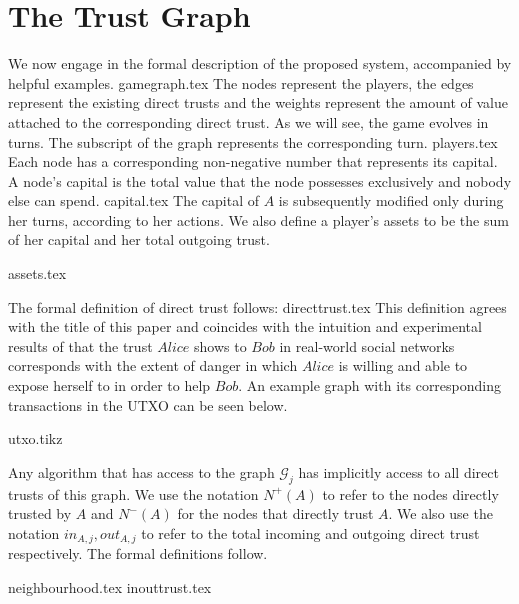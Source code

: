 \section{The Trust Graph}
   We now engage in the formal description of the proposed system, accompanied by helpful examples.
   {gamegraph.tex}
   The nodes represent the players, the edges represent the existing direct trusts and the weights represent the amount of
   value attached to the corresponding direct trust. As we will see, the game evolves in turns. The subscript of the graph
   represents the corresponding turn.
   {players.tex}
   Each node has a corresponding non-negative number that represents its capital. A node's capital is the total value that
   the node possesses exclusively and nobody else can spend.
   {capital.tex}
   The capital of $A$ is subsequently modified only during her turns, according to her actions. We also define a player's
   assets to be the sum of her capital and her total outgoing trust.

   {assets.tex}

   The formal definition of direct trust follows:
   {directtrust.tex}
   This definition agrees with the title of this paper and coincides with the intuition and experimental results of
   \cite{kmrs} that the trust $Alice$ shows to $Bob$ in real-world social networks corresponds with the extent
   of danger in which $Alice$ is willing and able to expose herself to in order to help $Bob$. An example graph with its
   corresponding transactions in the UTXO can be seen below.

   {utxo.tikz}

   Any algorithm that has access to the graph $\mathcal{G}_j$ has implicitly access to all direct trusts of this graph.
   We use the notation $N^{+}(A)$ to refer to the nodes directly trusted by $A$ and $N^{-}(A)$ for the nodes that directly
   trust $A$. We also use the notation $in_{A, j}, out_{A, j}$ to refer to the total incoming and outgoing direct trust
   respectively. The formal definitions follow. %

   {neighbourhood.tex}
   {inouttrust.tex}
